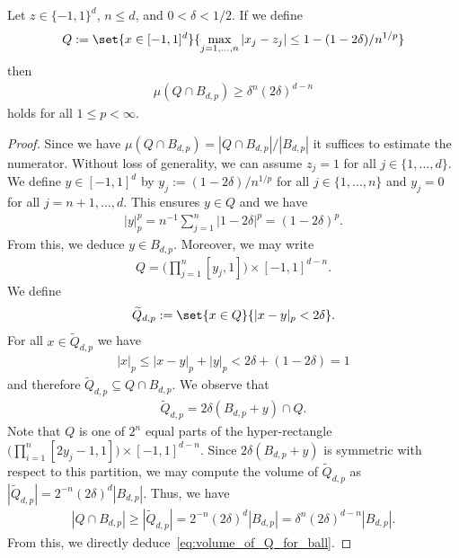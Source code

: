 \documentclass{amsart}[11pt]
\numberwithin{equation}{section}
\numberwithin{theorem}{section}
\begin{document}
\begin{lemma}\label{lem:volume_of_Q_for_ball}
    Let $z \in \{-1, 1\}^d$, $n\leq d$, and $0 < \delta < 1/2$. If we define
    \begin{align*}
        Q := \set{x \in [-1,1]^d}{ \max_{j = 1,\ldots,n} |x_j- z_j| \leq 1-(1-2\delta)/n^{1/p}}
    \end{align*}
    then
    \begin{align}\label{eq:volume_of_Q_for_ball}
        \mu\left(Q \cap B_{d, p}\right) \geq \delta^n (2\delta)^{d - n}
    \end{align}
    holds for all $1 \leq p < \infty$.
\end{lemma}
\begin{proof}
    Since we have $\mu\left(Q\cap B_{d, p}\right) = |Q\cap B_{d, p}|/|B_{d, p}|$ it suffices to estimate the numerator. Without loss of generality, we can assume $z_j = 1$ for all $j \in \{1, \ldots, d\}$. 
    We define $y \in [-1, 1]^d$ by $y_j := (1 -2\delta)/n^{1/p}$ for all $j \in \{1, \ldots, n\}$ and $y_j=0$ for all $j=n+1,\ldots,d$. This ensures $y \in Q$ and we have 
    \begin{align*}
        |y|_p^p = n^{-1} \sum_{j = 1}^n |1 - 2\delta|^p = (1 - 2\delta)^p.
    \end{align*}
    From this, we deduce $y \in  B_{d, p}$. Moreover, we may write
    \begin{align*}
        Q =\Big( \prod_{j=1}^n [y_j,1]\Big) \times [-1,1]^{d-n}.
    \end{align*}
    We define
    \begin{align*}
        \widetilde Q_{d, p} := \set{x \in Q}{|x - y|_p < 2\delta}.
    \end{align*}
    For all $x \in \widetilde Q_{d, p}$ we have
    \begin{align*}
        |x|_p \leq |x - y|_p + |y|_p < 2\delta + (1 - 2\delta) = 1
    \end{align*}
    and therefore $\widetilde Q_{d,p}\subseteq Q\cap B_{d,p}$. We observe that 
    \begin{align*}
    \widetilde Q_{d,p} = 2\delta(B_{d,p} + y) \cap Q.
    \end{align*}
    Note that $Q$ is one of $2^n$ equal parts of the hyper-rectangle $\Big(\prod_{i=1}^n [2y_j-1,1]\Big)\times [-1,1]^{d-n}$. Since $2\delta(B_{d,p} + y)$ is symmetric with respect to this partition, we may compute the volume of $\widetilde Q_{d,p}$ as $|\widetilde Q_{d,p}| = 2^{-n} (2\delta)^d |B_{d, p}|$. Thus, we have
    \begin{align*}
        |Q \cap B_{d, p}| \geq |\widetilde Q_{d, p}| = 2^{-n} (2\delta)^d |B_{d, p}| = \delta^n (2\delta)^{d-n} |B_{d, p}|.
    \end{align*}
    From this, we directly deduce~\eqref{eq:volume_of_Q_for_ball}.
\end{proof}
\end{document}
